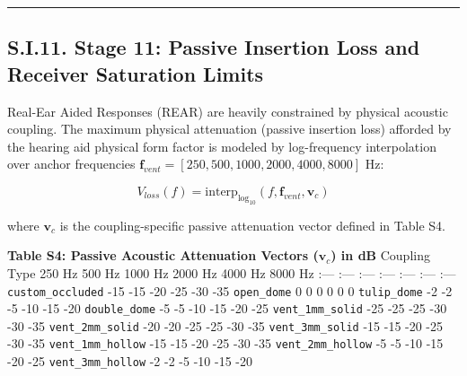 \documentclass[
  12pt,
]{article}
\begin{document}
\begin{center}\rule{0.5\linewidth}{0.5pt}\end{center}

\subsection{S.I.11. Stage 11: Passive Insertion Loss and Receiver
Saturation
Limits}\label{s.i.11.-stage-11-passive-insertion-loss-and-receiver-saturation-limits}

Real-Ear Aided Responses (REAR) are heavily constrained by physical
acoustic coupling. The maximum physical attenuation (passive insertion
loss) afforded by the hearing aid physical form factor is modeled by
log-frequency interpolation over anchor frequencies
\(\mathbf{f}_{vent} = [250, 500, 1000, 2000, 4000, 8000]\text{ Hz}\):

\begin{equation}
V_{loss}(f) = \text{interp}_{\log_{10}}\left(f, \mathbf{f}_{vent}, \mathbf{v}_c\right)
\end{equation}

where \(\mathbf{v}_c\) is the coupling-specific passive attenuation
vector defined in Table S4.

\textbf{Table S4: Passive Acoustic Attenuation Vectors
(\(\mathbf{v}_c\)) in dB} \textbar{} Coupling Type \textbar{} 250 Hz
\textbar{} 500 Hz \textbar{} 1000 Hz \textbar{} 2000 Hz \textbar{} 4000
Hz \textbar{} 8000 Hz \textbar{} \textbar{} :--- \textbar{} :---
\textbar{} :--- \textbar{} :--- \textbar{} :--- \textbar{} :---
\textbar{} :--- \textbar{} \textbar{} \texttt{custom\_occluded}
\textbar{} -15 \textbar{} -15 \textbar{} -20 \textbar{} -25 \textbar{}
-30 \textbar{} -35 \textbar{} \textbar{} \texttt{open\_dome} \textbar{}
0 \textbar{} 0 \textbar{} 0 \textbar{} 0 \textbar{} 0 \textbar{} 0
\textbar{} \textbar{} \texttt{tulip\_dome} \textbar{} -2 \textbar{} -2
\textbar{} -5 \textbar{} -10 \textbar{} -15 \textbar{} -20 \textbar{}
\textbar{} \texttt{double\_dome} \textbar{} -5 \textbar{} -5 \textbar{}
-10 \textbar{} -15 \textbar{} -20 \textbar{} -25 \textbar{} \textbar{}
\texttt{vent\_1mm\_solid} \textbar{} -25 \textbar{} -25 \textbar{} -25
\textbar{} -30 \textbar{} -30 \textbar{} -35 \textbar{} \textbar{}
\texttt{vent\_2mm\_solid} \textbar{} -20 \textbar{} -20 \textbar{} -25
\textbar{} -25 \textbar{} -30 \textbar{} -35 \textbar{} \textbar{}
\texttt{vent\_3mm\_solid} \textbar{} -15 \textbar{} -15 \textbar{} -20
\textbar{} -25 \textbar{} -30 \textbar{} -35 \textbar{} \textbar{}
\texttt{vent\_1mm\_hollow} \textbar{} -15 \textbar{} -15 \textbar{} -20
\textbar{} -25 \textbar{} -30 \textbar{} -35 \textbar{} \textbar{}
\texttt{vent\_2mm\_hollow} \textbar{} -5 \textbar{} -5 \textbar{} -10
\textbar{} -15 \textbar{} -20 \textbar{} -25 \textbar{} \textbar{}
\texttt{vent\_3mm\_hollow} \textbar{} -2 \textbar{} -2 \textbar{} -5
\textbar{} -10 \textbar{} -15 \textbar{} -20 \textbar{}
\end{document}
